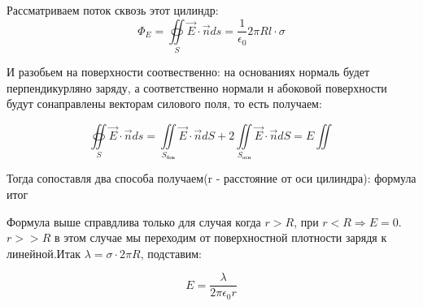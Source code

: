 \documentclass[../main.tex]{subfiles}
\begin{document}
\begin{center}
\end{center}

Рассматриваем поток сквозь этот цилиндр:
\[\Phi_E = \oiint\limits_S \vec E \cdot \vec n ds = \frac{1}{\epsilon_0} 2 \pi R l \cdot \sigma \]

И разобьем на поверхности соотвественно: на основаниях нормаль будет перпендикурляно заряду, а соответственно нормали н абоковой поверхности будут сонаправлены векторам силового поля, то есть получаем:

\[\oiint\limits_S \vec E \cdot \vec n ds = \iint\limits_{S_{бок}} \vec E \cdot \vec n dS + 2\iint\limits_{S_{осн}} \vec E \cdot \vec n dS = E \iint\]

Тогда сопоставля два способа получаем(r - расстояние от оси цилиндра):
формула итог 

Формула выше справдлива только для случая когда $r > R$, при $r < R \Rightarrow E = 0$. $r >> R$ в этом случае мы переходим от поверхностной плотности зарядя к линейной.Итак $\lambda = \sigma \cdot 2\pi R$, подставим:

\[ E = \frac{\lambda}{2\pi \epsilon_0 r}\]
\end{document}
